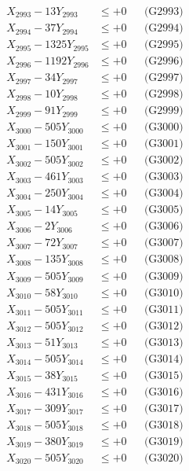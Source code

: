 \documentclass[a4paper,10pt]{article}
\begin{document}
{\begin{align}
X_{2993} - 13Y_{2993} &\leq +0 && \text{(G2993)} \\
X_{2994} - 37Y_{2994} &\leq +0 && \text{(G2994)} \\
X_{2995} - 1325Y_{2995} &\leq +0 && \text{(G2995)} \\
X_{2996} - 1192Y_{2996} &\leq +0 && \text{(G2996)} \\
X_{2997} - 34Y_{2997} &\leq +0 && \text{(G2997)} \\
X_{2998} - 10Y_{2998} &\leq +0 && \text{(G2998)} \\
X_{2999} - 91Y_{2999} &\leq +0 && \text{(G2999)} \\
X_{3000} - 505Y_{3000} &\leq +0 && \text{(G3000)} \\
\allowbreak
X_{3001} - 150Y_{3001} &\leq +0 && \text{(G3001)} \\
X_{3002} - 505Y_{3002} &\leq +0 && \text{(G3002)} \\
X_{3003} - 461Y_{3003} &\leq +0 && \text{(G3003)} \\
X_{3004} - 250Y_{3004} &\leq +0 && \text{(G3004)} \\
X_{3005} - 14Y_{3005} &\leq +0 && \text{(G3005)} \\
X_{3006} - 2Y_{3006} &\leq +0 && \text{(G3006)} \\
X_{3007} - 72Y_{3007} &\leq +0 && \text{(G3007)} \\
X_{3008} - 135Y_{3008} &\leq +0 && \text{(G3008)} \\
X_{3009} - 505Y_{3009} &\leq +0 && \text{(G3009)} \\
X_{3010} - 58Y_{3010} &\leq +0 && \text{(G3010)} \\
\allowbreak
X_{3011} - 505Y_{3011} &\leq +0 && \text{(G3011)} \\
X_{3012} - 505Y_{3012} &\leq +0 && \text{(G3012)} \\
X_{3013} - 51Y_{3013} &\leq +0 && \text{(G3013)} \\
X_{3014} - 505Y_{3014} &\leq +0 && \text{(G3014)} \\
X_{3015} - 38Y_{3015} &\leq +0 && \text{(G3015)} \\
X_{3016} - 431Y_{3016} &\leq +0 && \text{(G3016)} \\
X_{3017} - 309Y_{3017} &\leq +0 && \text{(G3017)} \\
X_{3018} - 505Y_{3018} &\leq +0 && \text{(G3018)} \\
X_{3019} - 380Y_{3019} &\leq +0 && \text{(G3019)} \\
X_{3020} - 505Y_{3020} &\leq +0 && \text{(G3020)} \\

\end{align}}
\end{document}
